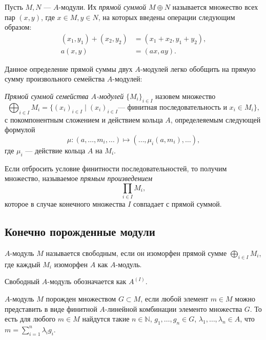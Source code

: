     \begin{Def}
        Пусть $M, N$ --- $A$-модули. Их \textit{прямой суммой $M \oplus N$} называется множество всех пар $(x, y)$, где $x \in M, y \in N$,
        на которых введены операции следующим образом:
        \begin{align*}
            (x_1, y_1) + (x_2, y_2) &= (x_1 + x_2, y_1 + y_2),\\
            a(x, y) &= (ax, ay).
        \end{align*}
    \end{Def}

    Данное определение прямой суммы двух $A$-модулей легко обобщить на прямую сумму произвольного семейства $A$-модулей:
    \begin{Def}
        \textit{Прямой суммой семейства $A$-модулей} $\{M_i\}_{i \in I}$ назовем множество 
        $$
            \bigoplus_{i \in I} M_i = \{(x_i)_{i \in I} \mid (x_i)_{i \in I} \text{--- финитная последовательность и } x_i \in M_i\},
        $$
        с покомпонентным сложением и действием кольца $A$, определеяемым следующей формулой
        $$
            \mu : (a, \dots, m_i, \dots) \mapsto (\dots, \mu_i(a, m_i), \dots),
        $$
        где $\mu_i$ --- действие кольца $A$ на $M_i$.
    \end{Def}

    Если отбросить условие финитности последовательностей, то получим множество, называемое \textit{прямым произведением}
    $$
        \prod_{i \in I} M_i,
    $$ 
    которое в случае конечного множества $I$ совпадает с прямой суммой.

    \subsection{Конечно порожденные модули}

    \begin{Def}
        $A$-модуль $M$ называется свободным, если он изоморфен прямой сумме $\bigoplus_{i \in I} M_i$, где каждый $M_i$ изоморфен $A$ как $A$-модуль.
    \end{Def}

    Свободный $A$-модуль обозначается как $A^{(I)}$.

    \begin{Def}
        $A$-модуль $M$ порожден множеством $G \subset M$, если любой элемент $m \in M$ можно представить в виде финитной $A$-линейной комбинации элементо множества $G$.
        То есть для любого $m \in M$ найдутся такие $n \in \mathbb{N}$, $g_1, \dots, g_n \in G$, $\lambda_1, \dots, \lambda_n \in A$, что $m = \sum_{i = 1}^n \lambda_i g_i$.
    \end{Def}

